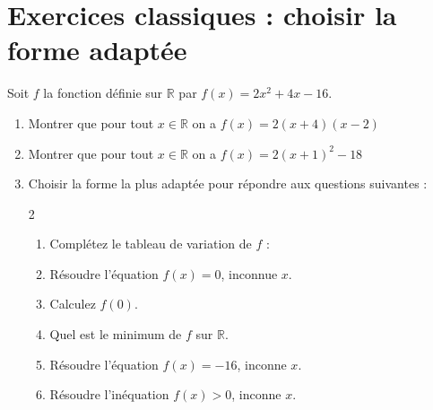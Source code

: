 \documentclass[main.tex]{subfiles}
\begin{document}
\section{Exercices classiques : choisir la forme adaptée}
\begin{exercise} Soit $f$ la fonction définie sur $\mathbb{R}$ par $f(x)=2x^2+4x-16$.
	\begin{enumerate}[leftmargin=*,label=\arabic*)]
		\item Montrer que pour tout $x\in\mathbb{R}$ on a $f(x)=2(x+4)(x-2)$
		\item Montrer que pour tout $x\in\mathbb{R}$ on a $f(x)=2(x+1)^2-18$
		\item Choisir la forme la plus adaptée pour répondre aux questions suivantes :
		\vspace{-1em}
\begin{multicols}{2}
	\begin{enumerate}[leftmargin=*,label=\alph*)]
			\item Complétez le tableau de variation de $f$ : \\
			\hfill
			\item Résoudre l'équation $f(x)=0$, inconnue $x$.
			\item Calculez $f(0)$.
			\item Quel est le minimum de $f$ sur $\mathbb{R}$.
			\item Résoudre l'équation $f(x)=-16$, inconne $x$.
			\item Résoudre l'inéquation $f(x)>0$, inconne $x$.
		\end{enumerate}
	\end{multicols}
	\end{enumerate} 
\end{exercise}
\end{document}
